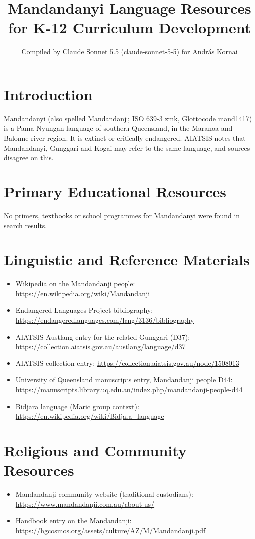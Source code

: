 \documentclass[12pt]{article}
\title{Mandandanyi Language Resources for K-12 Curriculum Development}
\author{Compiled by Claude Sonnet 5.5 (claude-sonnet-5-5) for Andr\'as Kornai}
\date{}
\begin{document}
\maketitle

\section{Introduction}
Mandandanyi (also spelled Mandandanji; ISO 639-3 zmk, Glottocode mand1417) is a Pama-Nyungan language of southern Queensland, in the Maranoa and Balonne river region. It is extinct or critically endangered. AIATSIS notes that Mandandanyi, Gunggari and Kogai may refer to the same language, and sources disagree on this.

\section{Primary Educational Resources}
No primers, textbooks or school programmes for Mandandanyi were found in search results.

\section{Linguistic and Reference Materials}
\begin{itemize}
\item Wikipedia on the Mandandanji people: \url{https://en.wikipedia.org/wiki/Mandandanji}
\item Endangered Languages Project bibliography: \url{https://endangeredlanguages.com/lang/3136/bibliography}
\item AIATSIS Austlang entry for the related Gunggari (D37): \url{https://collection.aiatsis.gov.au/austlang/language/d37}
\item AIATSIS collection entry: \url{https://collection.aiatsis.gov.au/node/1508013}
\item University of Queensland manuscripts entry, Mandandanji people D44: \url{https://manuscripts.library.uq.edu.au/index.php/mandandanji-people-d44}
\item Bidjara language (Maric group context): \url{https://en.wikipedia.org/wiki/Bidjara_language}
\end{itemize}

\section{Religious and Community Resources}
\begin{itemize}
\item Mandandanji community website (traditional custodians): \url{https://www.mandandanji.com.au/about-us/}
\item Handbook entry on the Mandandanji: \url{https://hgcosmos.org/assets/culture/AZ/M/Mandandanji.pdf}
\end{itemize}
\end{document}
